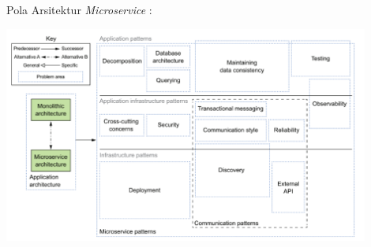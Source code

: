 Pola Arsitektur \textit{Microservice}  \cite{1C7}:
\begin{center}
	\includegraphics[width=12cm]{img/PolaMicroservice.png}
	\label{fig:msa}
\end{center}

